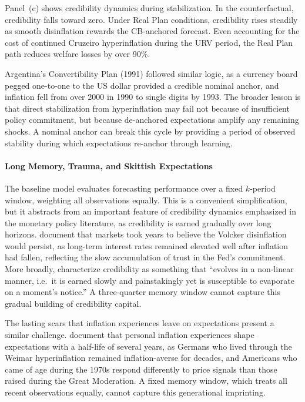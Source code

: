 \documentclass[10pt]{article}
\begin{document}
Panel~(c) shows credibility dynamics during stabilization. In the counterfactual, credibility falls toward zero. Under Real Plan conditions, credibility rises steadily as smooth disinflation rewards the CB-anchored forecast. Even accounting for the cost of continued Cruzeiro hyperinflation during the URV period, the Real Plan path reduces welfare losses by over 90\%.

Argentina's Convertibility Plan (1991) followed similar logic, as a currency board pegged one-to-one to the US dollar provided a credible nominal anchor, and inflation fell from over 2000 in 1990 to single digits by 1993. The broader lesson is that direct stabilization from hyperinflation may fail not because of insufficient policy commitment, but because de-anchored expectations amplify any remaining shocks. A nominal anchor can break this cycle by providing a period of observed stability during which expectations re-anchor through learning.

\paragraph{Long Memory, Trauma, and Skittish Expectations}

The baseline model evaluates forecasting performance over a fixed $k$-period window, weighting all observations equally. This is a convenient simplification, but it abstracts from an important feature of credibility dynamics emphasized in the monetary policy literature, as credibility is earned gradually over long horizons. \citet{goodfriend2005} document that markets took years to believe the Volcker disinflation would persist, as long-term interest rates remained elevated well after inflation had fallen, reflecting the slow accumulation of trust in the Fed's commitment. More broadly, \citet{bordosiklos2015} characterize credibility as something that ``evolves in a non-linear manner, i.e.\ it is earned slowly and painstakingly yet is susceptible to evaporate on a moment's notice.'' A three-quarter memory window cannot capture this gradual building of credibility capital.

The lasting scars that inflation experiences leave on expectations present a similar challenge. \citet{malmendier2016learning} document that personal inflation experiences shape expectations with a half-life of several years, as Germans who lived through the Weimar hyperinflation remained inflation-averse for decades, and Americans who came of age during the 1970s respond differently to price signals than those raised during the Great Moderation. A fixed memory window, which treats all recent observations equally, cannot capture this generational imprinting.
\end{document}

